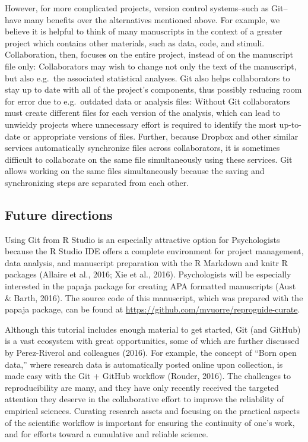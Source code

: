 \documentclass[
  american,
  ,doc,floatsintext]{apa6}
\begin{document}
However, for more complicated projects, version control systems--such as Git--have many benefits over the alternatives mentioned above. For example, we believe it is helpful to think of many manuscripts in the context of a greater project which contains other materials, such as data, code, and stimuli. Collaboration, then, focuses on the entire project, instead of on the manuscript file only: Collaborators may wish to change not only the text of the manuscript, but also e.g.~the associated statistical analyses. Git also helps collaborators to stay up to date with all of the project's components, thus possibly reducing room for error due to e.g.~outdated data or analysis files: Without Git collaborators must create different files for each version of the analysis, which can lead to unwieldy projects where unnecessary effort is required to identify the most up-to-date or appropriate versions of files. Further, because Dropbox and other similar services automatically synchronize files across collaborators, it is sometimes difficult to collaborate on the same file simultaneously using these services. Git allows working on the same files simultaneously because the saving and synchronizing steps are separated from each other.

\hypertarget{future-directions}{%
\subsection{Future directions}\label{future-directions}}

Using Git from R Studio is an especially attractive option for Psychologists because the R Studio IDE offers a complete environment for project management, data analysis, and manuscript preparation with the R Markdown and knitr R packages (Allaire et al., 2016; Xie et al., 2016). Psychologists will be especially interested in the papaja package for creating APA formatted manuscripts (Aust \& Barth, 2016). The source code of this manuscript, which was prepared with the papaja package, can be found at \url{https://github.com/mvuorre/reproguide-curate}.

Although this tutorial includes enough material to get started, Git (and GitHub) is a vast ecosystem with great opportunities, some of which are further discussed by Perez-Riverol and colleagues (2016). For example, the concept of ``Born open data,'' where research data is automatically posted online upon collection, is made easy with the Git + GitHub workflow (Rouder, 2016). The challenges to reproducibility are many, and they have only recently received the targeted attention they deserve in the collaborative effort to improve the reliability of empirical sciences. Curating research assets and focusing on the practical aspects of the scientific workflow is important for ensuring the continuity of one's work, and for efforts toward a cumulative and reliable science.
\end{document}

